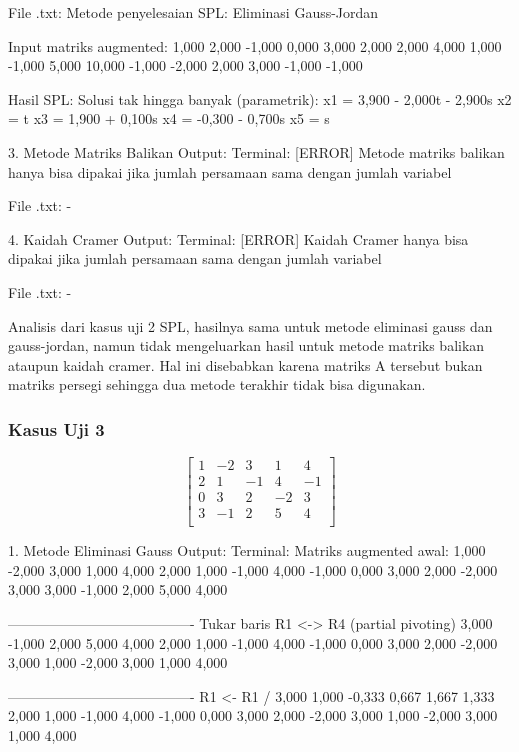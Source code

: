 \documentclass[12pt]{article}
\begin{document}
\begin{enumerate}
\begin{keluaran}
File .txt:
Metode penyelesaian SPL: Eliminasi Gauss-Jordan

Input matriks augmented:
1,000	2,000	-1,000	0,000	3,000	2,000
2,000	4,000	1,000	-1,000	5,000	10,000
-1,000	-2,000	2,000	3,000	-1,000	-1,000

Hasil SPL:
Solusi tak hingga banyak (parametrik):
x1 = 3,900 - 2,000t - 2,900s
x2 = t
x3 = 1,900 + 0,100s
x4 = -0,300 - 0,700s
x5 = s

3. Metode Matriks Balikan
Output:
Terminal:
[ERROR] Metode matriks balikan hanya bisa dipakai jika jumlah persamaan sama dengan jumlah variabel

File .txt:
-

4. Kaidah Cramer
Output:
Terminal:
[ERROR] Kaidah Cramer hanya bisa dipakai jika jumlah persamaan sama dengan jumlah variabel

File .txt:
-
\end{keluaran}
Analisis dari kasus uji 2 SPL, hasilnya sama untuk metode eliminasi gauss dan gauss-jordan, namun tidak mengeluarkan hasil untuk metode matriks balikan ataupun kaidah cramer. Hal ini disebabkan karena matriks A tersebut bukan matriks persegi sehingga dua metode terakhir tidak bisa digunakan.
\subsubsection{Kasus Uji 3}
\begin{equation}
    \begin{bmatrix}
        1 & -2 & 3 & 1 & 4 \\
        2 & 1 & -1 & 4 & -1 \\
        0 & 3 & 2 & -2 & 3 \\
        3 & -1 & 2 & 5 & 4 \\
    \end{bmatrix}
\end{equation}
\begin{keluaran}
1. Metode Eliminasi Gauss
Output:
Terminal:
Matriks augmented awal:
1,000   -2,000  3,000   1,000   4,000
2,000   1,000   -1,000  4,000   -1,000
0,000   3,000   2,000   -2,000  3,000
3,000   -1,000  2,000   5,000   4,000

----------------------------------------
Tukar baris R1 <-> R4 (partial pivoting)
3,000   -1,000  2,000   5,000   4,000
2,000   1,000   -1,000  4,000   -1,000
0,000   3,000   2,000   -2,000  3,000
1,000   -2,000  3,000   1,000   4,000

----------------------------------------
R1 <- R1 / 3,000
1,000   -0,333  0,667   1,667   1,333
2,000   1,000   -1,000  4,000   -1,000
0,000   3,000   2,000   -2,000  3,000
1,000   -2,000  3,000   1,000   4,000


\end{keluaran}
\end{enumerate}
\end{document}
